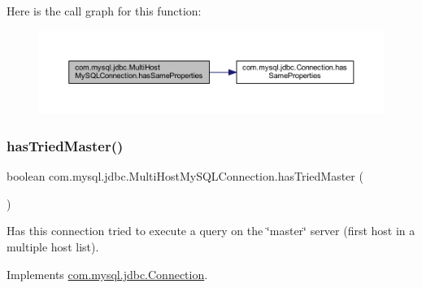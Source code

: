 Here is the call graph for this function\+:
\nopagebreak
\begin{figure}[H]
\begin{center}
\leavevmode
\includegraphics[width=350pt]{classcom_1_1mysql_1_1jdbc_1_1_multi_host_my_s_q_l_connection_a6d1ba78a6ad110ec1027fa341ceef1e5_cgraph}
\end{center}
\end{figure}
\mbox{\label{classcom_1_1mysql_1_1jdbc_1_1_multi_host_my_s_q_l_connection_a0c6bc4351473d95ef46999773702ed18}} 
\subsubsection{\texorpdfstring{has\+Tried\+Master()}{hasTriedMaster()}}
{\footnotesize\ttfamily boolean com.\+mysql.\+jdbc.\+Multi\+Host\+My\+S\+Q\+L\+Connection.\+has\+Tried\+Master (\begin{DoxyParamCaption}{ }\end{DoxyParamCaption})}

Has this connection tried to execute a query on the \char`\"{}master\char`\"{} server (first host in a multiple host list). 

Implements \mbox{\hyperlink{interfacecom_1_1mysql_1_1jdbc_1_1_connection_a2bc23d62512f6dfaac0566369a0125df}{com.\+mysql.\+jdbc.\+Connection}}.

